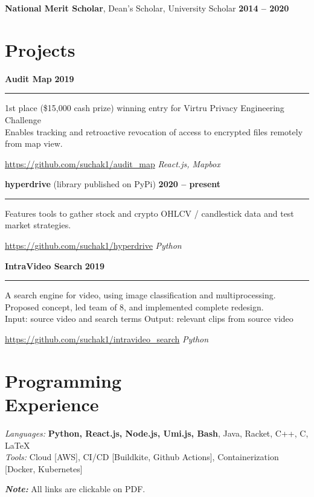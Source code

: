 \documentclass[margin]{resume}
\begin{document}
\textbf{National Merit Scholar}, Dean’s Scholar, University Scholar \hfill \textbf{2014 -- 2020} %

    \section{\mysidestyle Projects}
\textcolor{blu}{\textbf{Audit Map}} \hfill \textbf{2019}
\hrule
1st place (\$15,000 cash prize) winning entry for Virtru Privacy Engineering Challenge \\ 
Enables tracking and retroactive revocation of access to encrypted files remotely from map view. 

\url{https://github.com/suchak1/audit_map} \hfill \textit{React.js, Mapbox}

\textbf{hyperdrive} (library published on PyPi) \hfill \textbf{2020 -- present}
\hrule
Features tools to gather stock and crypto OHLCV / candlestick data and test market strategies. 

\url{https://github.com/suchak1/hyperdrive} \hfill \textit{Python}

\textbf{IntraVideo Search} \hfill \textbf{2019}
\vspace{1mm}
\hrule
A search engine for video, using image classification and multiprocessing. \\Proposed concept, led team of 8, and implemented complete redesign.\\ Input: source video and search terms \hfill Output: relevant clips from source video

\url{https://github.com/suchak1/intravideo_search} \hfill \textit{Python}

        \section{\mysidestyle Programming\\Experience}

    \emph{Languages:} \textbf{Python, React.js, Node.js, Umi.js, Bash}, Java, Racket, C++, C, \LaTeX \\
    \emph{Tools:} Cloud [AWS], CI/CD [Buildkite, Github Actions], Containerization [Docker, Kubernetes]
    
\textbf {\textit {Note:}} All links are clickable on PDF.
    
\end{document}
